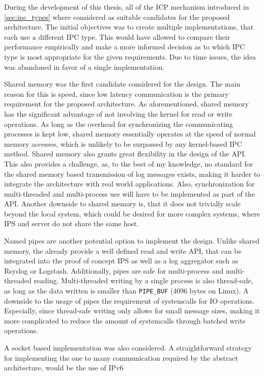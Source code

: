 During the development of this thesis, all of the \ac{ICP} mechanism introduced in \ref{sec:ipc_types} where considered as suitable candidates for the proposed architecture. The initial
objectives was to create multiple implementations, that each use a different \ac{IPC} type. This would have allowed to compare their performance empirically and make a more informed decision as to 
which \ac{IPC} type is most appropriate for the given requirements.
Due to time issues, the idea was abandoned in favor of a single implementation.
\par
Shared memory was the first candidate considered for the design. The main reason for this is speed, since low latency communication is 
the primary requirement for the proposed architecture. As aforementioned, shared memory has the significant advantage of not involving the 
kernel for read or write operations. As long as the overhead for synchronizing the communicating processes is kept low, shared memory essentially
operates at the speed of normal memory accesses, which is unlikely to be surpassed by any kernel-based \ac{IPC} method. Shared memory also grants 
great flexibility in the design of the API. This also provides a challenge, as, to the best of my knowledge, no standard for the shared memory based
transmission of log messages exists, making it harder to integrate the architecture with real world applications. Also, synchronization for multi-threaded
and multi-process use will have to be implemented as part of the API. Another downside to shared memory is, that
it does not trivially scale beyond the local system, which could be desired for more complex systems, where \ac{IPS} and server do not share the same host.
\par 
Named pipes are another potential option to implement the design. Unlike shared memory, the already provide a well defined read and write API,
that can be integrated into the proof of concept \ac{IPS} as well as a log aggregator such as Rsyslog or Logstash. Additionally, pipes are safe for multi-process
and multi-threaded reading. Multi-threaded writing by a single process is also thread-safe, as long as the data written is smaller than \texttt{PIPE\_BUF} (4096 bytes on Linux)\cite{pipe}.
A downside to the usage of pipes the requirement of systemcalls for \ac{IO} operations. Especially, since thread-safe writing only allows for small message sizes, making it more complicated 
to reduce the amount of systemcalls through batched write operations. 
\par  
A socket based implementation was also considered. A straightforward strategy for implementing the one to many communication required by the abstract architecture, would be the use of \ac{IPv6}
